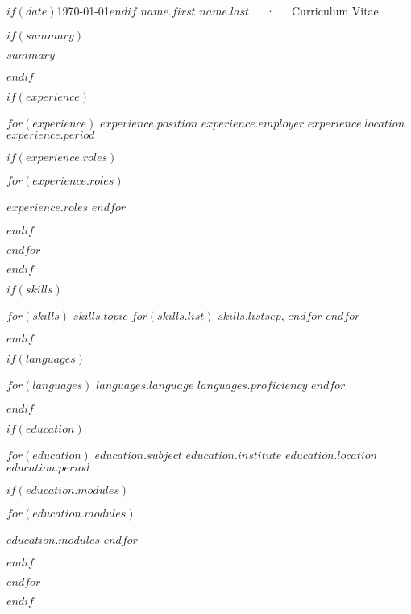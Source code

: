 \documentclass[11pt, a4paper]{awesome-cv}
\begin{document}
\makecvheader

\makecvfooter
  {$if(date)$\today$endif$}
  {$name.first$ $name.last$~~~·~~~Curriculum Vitae}
  {\thepage}



$if(summary)$
  \begin{cvparagraph}

    $summary$
  \end{cvparagraph}
$endif$

$if(experience)$
  \begin{cventries}

    $for(experience)$
      \cventry
      {$experience.position$}
      {$experience.employer$}
      {$experience.location$}
      {$experience.period$}
      {
        $if(experience.roles)$
          \begin{cvitems}
            $for(experience.roles)$
              \item {$experience.roles$}
            $endfor$
          \end{cvitems}
        $endif$
      }

    $endfor$
  \end{cventries}
$endif$

$if(skills)$
  \begin{cvskills}
    $for(skills)$
      \cvskill
      {$skills.topic$}
      {
        $for(skills.list)$
          $skills.list$$sep$,
        $endfor$
      }
    $endfor$
  \end{cvskills}
$endif$

$if(languages)$
  \begin{cvskills}
    $for(languages)$
      \cvskill
      {$languages.language$}
      {$languages.proficiency$}
    $endfor$
  \end{cvskills}
$endif$

$if(education)$
  \begin{cventries}
    $for(education)$
      \cventry
      {$education.subject$}
      {$education.institute$}
      {$education.location$}
      {$education.period$}
      {
        $if(education.modules)$
          \begin{cvitems}
            $for(education.modules)$
              \item {$education.modules$}
            $endfor$
          \end{cvitems}
        $endif$
      }
    $endfor$
  \end{cventries}
$endif$
\end{document}
